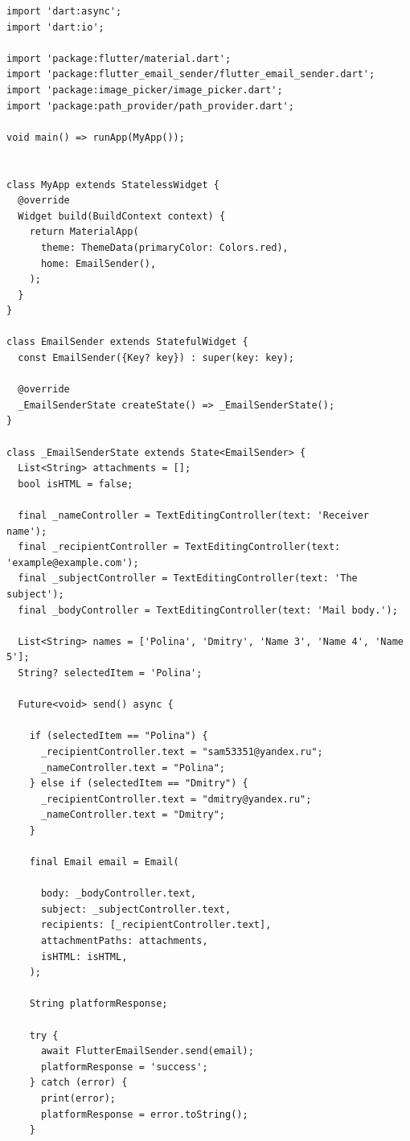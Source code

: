 \documentclass[a4paper, 14pt]{extarticle}
\begin{document}
\begin{lstlisting}[language={},caption={Отправка электронных сообщений},label={lst:code1}]
import 'dart:async';
import 'dart:io';

import 'package:flutter/material.dart';
import 'package:flutter_email_sender/flutter_email_sender.dart';
import 'package:image_picker/image_picker.dart';
import 'package:path_provider/path_provider.dart';

void main() => runApp(MyApp());


class MyApp extends StatelessWidget {
  @override
  Widget build(BuildContext context) {
    return MaterialApp(
      theme: ThemeData(primaryColor: Colors.red),
      home: EmailSender(),
    );
  }
}

class EmailSender extends StatefulWidget {
  const EmailSender({Key? key}) : super(key: key);

  @override
  _EmailSenderState createState() => _EmailSenderState();
}

class _EmailSenderState extends State<EmailSender> {
  List<String> attachments = [];
  bool isHTML = false;

  final _nameController = TextEditingController(text: 'Receiver name');
  final _recipientController = TextEditingController(text: 'example@example.com');
  final _subjectController = TextEditingController(text: 'The subject');
  final _bodyController = TextEditingController(text: 'Mail body.');

  List<String> names = ['Polina', 'Dmitry', 'Name 3', 'Name 4', 'Name 5'];
  String? selectedItem = 'Polina';

  Future<void> send() async {

    if (selectedItem == "Polina") {
      _recipientController.text = "sam53351@yandex.ru";
      _nameController.text = "Polina";
    } else if (selectedItem == "Dmitry") {
      _recipientController.text = "dmitry@yandex.ru";
      _nameController.text = "Dmitry";
    }

    final Email email = Email(

      body: _bodyController.text,
      subject: _subjectController.text,
      recipients: [_recipientController.text],
      attachmentPaths: attachments,
      isHTML: isHTML,
    );

    String platformResponse;

    try {
      await FlutterEmailSender.send(email);
      platformResponse = 'success';
    } catch (error) {
      print(error);
      platformResponse = error.toString();
    }


\end{lstlisting}
\end{document}
